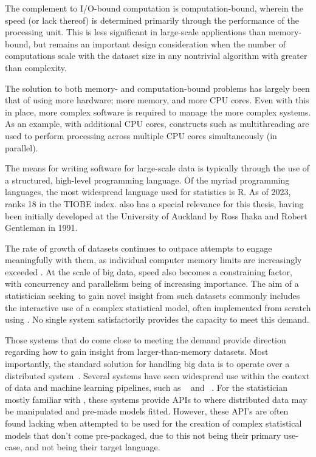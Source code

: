 The complement to I/O-bound computation is computation-bound,
wherein the speed (or lack thereof) is determined primarily through the
performance of the processing unit. This is less significant in
large-scale applications than memory-bound, but remains an important
design consideration when the number of computations scale with the
dataset size in any nontrivial algorithm with greater than
 complexity.

The solution to both memory- and computation-bound problems has largely
been that of using more hardware; more memory, and more CPU cores. Even
with this in place, more complex software is required to manage the more
complex systems. As an example, with additional CPU cores, constructs
such as multithreading are used to perform processing across multiple
CPU cores simultaneously (in parallel).

The means for writing software for large-scale data is typically through
the use of a structured, high-level programming language. Of the myriad
programming languages, the most widespread language used for statistics
is R. As of 2023, \R{} ranks {18} in the TIOBE index.
\R{} also has a special relevance for this thesis, having been
initially developed at the University of Auckland by Ross Ihaka and
Robert Gentleman in 1991\cite{ihaka1996r}.

The rate of growth of datasets continues to outpace attempts to engage meaningfully with them, as individual computer memory limits are increasingly exceeded \cite{kleppmann2017dataintensive}.
At the scale of big data, speed also becomes a constraining factor, with concurrency and parallelism being of increasing importance.
The aim of a statistician seeking to gain novel insight from such datasets commonly includes the interactive use of a complex statistical model, often implemented from scratch using \R{}.
No single system satisfactorily provides the capacity to meet this demand.

Those systems that do come close to meeting the demand provide direction regarding how to gain insight from larger-than-memory datasets.
Most importantly, the standard solution for handling big data is to operate over a distributed system~\cite{boja2012distributed}.
Several systems have seen widespread use within the context of data and machine learning pipelines, such as ~\cite{zaharia2016apache} and ~\cite{shvachko2010hadoop}.
For the statistician mostly familiar with \R{}, these systems provide APIs to \R{} where distributed data may be manipulated and pre-made models fitted.
However, these API's are often found lacking when attempted to be used for the creation of complex statistical models that don't come pre-packaged, due to this not being their primary use-case, and \R{} not being their target language.

